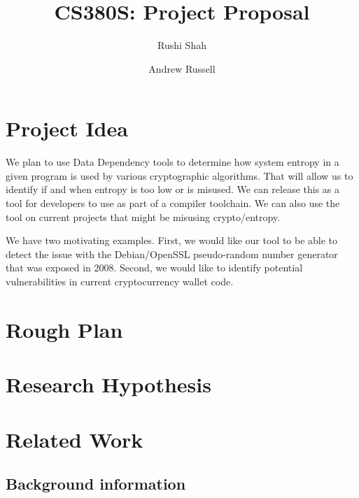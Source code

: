 \documentclass[letterpaper,twocolumn,10pt]{article}
\begin{document}
\date{}

\title{\Large \bf CS380S: Project Proposal}

\author{
{\rm Rushi Shah}
\and
{\rm Andrew Russell}
}

\maketitle

\section{Project Idea}

We plan to use Data Dependency tools to determine how system entropy in a given program is used by various cryptographic algorithms. That will allow us to identify if and when entropy is too low or is misused. We can release this as a tool for developers to use as part of a compiler toolchain. We can also use the tool on current projects that might be misusing crypto/entropy. 

We have two motivating examples. First, we would like our tool to be able to detect the issue with the Debian/OpenSSL pseudo-random number generator that was exposed in 2008. Second, we would like to identify potential vulnerabilities in current cryptocurrency wallet code. 

\section{Rough Plan}


\section{Research Hypothesis}


\section{Related Work}

\subsection{Background information}
\end{document}
